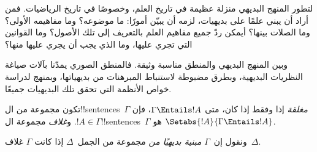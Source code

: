 \documentclass[../../../include/open-logic-section]{subfiles}
\begin{document}

\begin{explain}
لتطور المنهج البديهي منزلة عظيمة في تاريخ العلم، وخصوصًا في
تاريخ الرياضيات. فمن أراد أن يبني علمًا على بديهيات، لزمه أن
يبيّن أمورًا: ما موضوعه؟ وما مفاهيمه الأولى؟ وما الصلات بينها؟
أيمكن ردّ جميع مفاهيم العلم بالتعريف إلى تلك الأصول؟ وما القوانين
التي تجري عليها، وما الذي يجب أن يجري عليها منها؟

وبين المنهج البديهي والمنطق مناسبة وثيقة. فالمنطق الصوري يمدّنا
بآلات صياغة النظريات البديهية، وبطرق مضبوطة لاستنباط المبرهنات
من بديهياتها، وبمنهج لدراسة خواص الأنظمة التي تحقق تلك البديهيات
جميعًا.
\end{explain}

\begin{defn}
تكون مجموعة من ال!!{sentence}s~$\Gamma$ \emph{مغلقة} إذا وفقط إذا
كان، متى $\Gamma \Entails !A$، فإن $!A \in \Gamma$. و\emph{غلاف}
مجموعة ال!!{sentence}s~$\Gamma$ هو
$\Setabs{!A}{\Gamma \Entails !A}$.

ونقول إن~$\Gamma$ \emph{مبنية بديهيًا من} مجموعة من الجمل~$\Delta$
إذا كانت $\Gamma$ غلاف~$\Delta$.
\end{defn}
\end{document}

